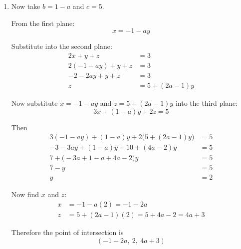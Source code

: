 \documentclass[leqno]{article}
\begin{document}
\begin{enumerate}[
  label=\textbf{\arabic*.},
  leftmargin=*,
  topsep=0pt,
  partopsep=0pt,
  parsep=0pt
]
\begin{djsSolution}
\begin{enumerate}[label=\textbf{(\alph*)}]
\begin{enumerate}[label=(\roman*)]
    This is satisfied for every point on the line precisely when
    \[
    c=7
    \]
  \end{enumerate}

  \item Now take \(b=1-a\) and \(c=5\).

  From the first plane:
  \[
  x=-1-ay
  \]

  Substitute into the second plane:
  \begin{align*}
  2x+y+z&=3\\
  2(-1-ay)+y+z&=3\\
  -2-2ay+y+z&=3\\
  z&=5+(2a-1)y
  \end{align*}

  Now substitute \(x=-1-ay\) and \(z=5+(2a-1)y\) into the third plane:
  \[
  3x+(1-a)y+2z=5
  \]

  Then
  \begin{align*}
  3(-1-ay)+(1-a)y+2\bigl(5+(2a-1)y\bigr)&=5\\
  -3-3ay+(1-a)y+10+(4a-2)y&=5\\
  7+\bigl(-3a+1-a+4a-2\bigr)y&=5\\
  7-y&=5\\
  y&=2
  \end{align*}

  Now find \(x\) and \(z\):
  \begin{align*}
  x&=-1-a(2)=-1-2a\\
  z&=5+(2a-1)(2)=5+4a-2=4a+3
  \end{align*}

  Therefore the point of intersection is
  \[
  (-1-2a,\ 2,\ 4a+3)
  \]
\end{enumerate}
\end{djsSolution}


\newpage

\questionitem


\end{enumerate}
\end{document}
